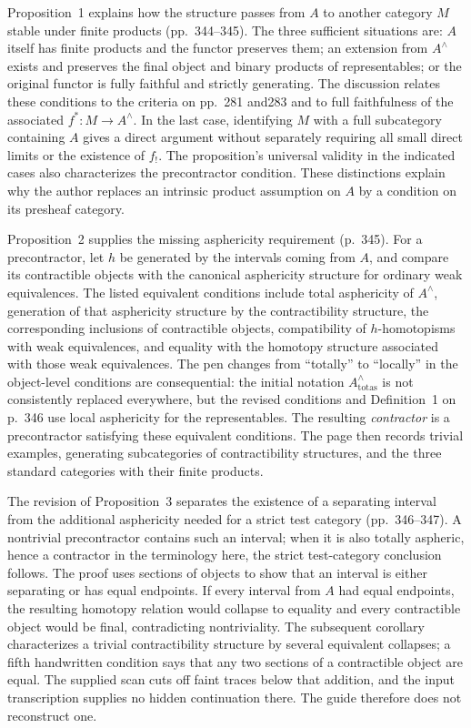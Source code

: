 Proposition~1 explains how the structure passes from $A$ to another category $M$ stable under finite products (pp.~344--345). The three sufficient situations are: $A$ itself has finite products and the functor preserves them; an extension from $A^{\wedge}$ exists and preserves the final object and binary products of representables; or the original functor is fully faithful and strictly generating. The discussion relates these conditions to the criteria on pp.~281 and283 and to full faithfulness of the associated $f^*:M\to A^{\wedge}$. In the last case, identifying $M$ with a full subcategory containing $A$ gives a direct argument without separately requiring all small direct limits or the existence of $f_!$. The proposition's universal validity in the indicated cases also characterizes the precontractor condition. These distinctions explain why the author replaces an intrinsic product assumption on $A$ by a condition on its presheaf category.

Proposition~2 supplies the missing asphericity requirement (p.~345). For a precontractor, let $h$ be generated by the intervals coming from $A$, and compare its contractible objects with the canonical asphericity structure for ordinary weak equivalences. The listed equivalent conditions include total asphericity of $A^{\wedge}$, generation of that asphericity structure by the contractibility structure, the corresponding inclusions of contractible objects, compatibility of $h$-homotopisms with weak equivalences, and equality with the homotopy structure associated with those weak equivalences. The pen changes from ``totally'' to ``locally'' in the object-level conditions are consequential: the initial notation $A^{\wedge}_{\mathrm{totas}}$ is not consistently replaced everywhere, but the revised conditions and Definition~1 on p.~346 use local asphericity for the representables. The resulting \emph{contractor} is a precontractor satisfying these equivalent conditions. The page then records trivial examples, generating subcategories of contractibility structures, and the three standard categories with their finite products.

The revision of Proposition~3 separates the existence of a separating interval from the additional asphericity needed for a strict test category (pp.~346--347). A nontrivial precontractor contains such an interval; when it is also totally aspheric, hence a contractor in the terminology here, the strict test-category conclusion follows. The proof uses sections of objects to show that an interval is either separating or has equal endpoints. If every interval from $A$ had equal endpoints, the resulting homotopy relation would collapse to equality and every contractible object would be final, contradicting nontriviality. The subsequent corollary characterizes a trivial contractibility structure by several equivalent collapses; a fifth handwritten condition says that any two sections of a contractible object are equal. The supplied scan cuts off faint traces below that addition, and the input transcription supplies no hidden continuation there. The guide therefore does not reconstruct one.

